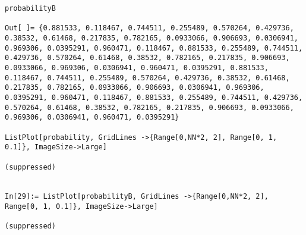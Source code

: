 \begin{lstlisting}
probabilityB

Out[ ]= {0.881533, 0.118467, 0.744511, 0.255489, 0.570264, 0.429736, 0.38532, 0.61468, 0.217835, 0.782165, 0.0933066, 0.906693, 0.0306941, 0.969306, 0.0395291, 0.960471, 0.118467, 0.881533, 0.255489, 0.744511, 0.429736, 0.570264, 0.61468, 0.38532, 0.782165, 0.217835, 0.906693, 0.0933066, 0.969306, 0.0306941, 0.960471, 0.0395291, 0.881533, 0.118467, 0.744511, 0.255489, 0.570264, 0.429736, 0.38532, 0.61468, 0.217835, 0.782165, 0.0933066, 0.906693, 0.0306941, 0.969306, 0.0395291, 0.960471, 0.118467, 0.881533, 0.255489, 0.744511, 0.429736, 0.570264, 0.61468, 0.38532, 0.782165, 0.217835, 0.906693, 0.0933066, 0.969306, 0.0306941, 0.960471, 0.0395291}

ListPlot[probability, GridLines ->{Range[0,NN*2, 2], Range[0, 1, 0.1]}, ImageSize->Large]

(suppressed)


In[29]:= ListPlot[probabilityB, GridLines ->{Range[0,NN*2, 2], Range[0, 1, 0.1]}, ImageSize->Large]

(suppressed)

\end{lstlisting}